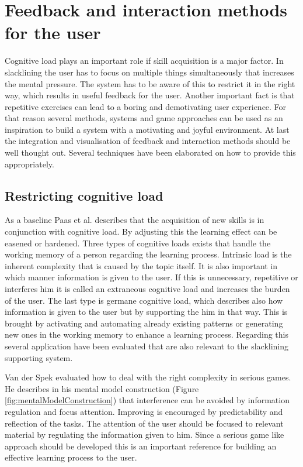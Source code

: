 \section{Feedback and interaction methods for the user}

Cognitive load plays an important role if skill acquisition is a major factor. In slacklining the user has to focus on multiple things simultaneously that increases the mental pressure. The system has to be aware of this to restrict it in the right way, which results in useful feedback for the user. Another important fact is that repetitive exercises can lead to a boring and demotivating user experience. For that reason several methods, systems and game approaches can be used as an inspiration to build a system with a motivating and joyful environment. At last the integration and visualisation of feedback and interaction methods should be well thought out. Several techniques have been elaborated on how to provide this appropriately.

\subsection{Restricting cognitive load}

As a baseline Paas et al. \cite{Paas2003-xt} describes that the acquisition of new skills is in conjunction with cognitive load. By adjusting this the learning effect can be easened or hardened. Three types of cognitive loads exists that handle the working memory of a person regarding the learning process. Intrinsic load is the inherent complexity that is caused by the topic itself. It is also important in which manner information is given to the user. If this is unnecessary, repetitive or interferes him it is called an extraneous cognitive load and increases the burden of the user. The last type is germane cognitive load, which describes also how information is given to the user but by supporting the him in that way. This is brought by activating and automating already existing patterns or generating new ones in the working memory to enhance a learning process. Regarding this several application have been evaluated that are also relevant to the slacklining supporting system.

Van der Spek \cite{Van_der_Spek2010-fe} evaluated how to deal with the right complexity in serious games. He describes in his mental model construction (Figure \ref{fig:mentalModelConstruction}) that interference can be avoided by information regulation and focus attention. Improving is encouraged by predictability and reflection of the tasks. The attention of the user should be focused to relevant material by regulating the information given to him. Since a serious game like approach should be developed this is an important reference for building an effective learning process to the user.

